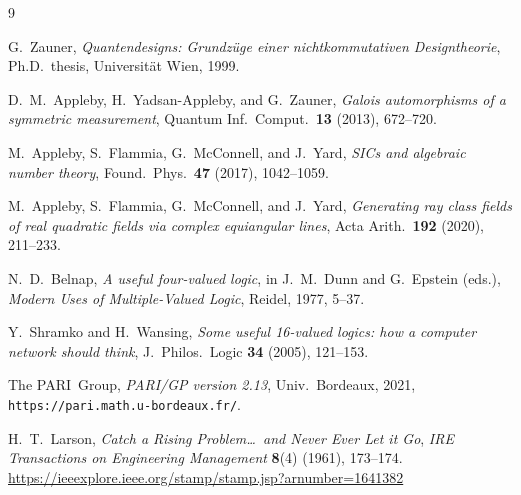 \documentclass[12pt,a4paper]{article}
\begin{document}
\begin{thebibliography}{9}

G.\ Zauner, \emph{Quantendesigns: Grundz\"uge einer nichtkommutativen Designtheorie}, Ph.D.\ thesis, Universit\"at Wien, 1999.

D.\ M.\ Appleby, H.\ Yadsan-Appleby, and G.\ Zauner,
\emph{Galois automorphisms of a symmetric measurement},
Quantum Inf.\ Comput.\ \textbf{13} (2013), 672--720.

M.\ Appleby, S.\ Flammia, G.\ McConnell, and J.\ Yard,
\emph{SICs and algebraic number theory},
Found.\ Phys.\ \textbf{47} (2017), 1042--1059.

M.\ Appleby, S.\ Flammia, G.\ McConnell, and J.\ Yard,
\emph{Generating ray class fields of real quadratic fields via complex equiangular lines}, Acta Arith.\ \textbf{192} (2020), 211--233.

N.\ D.\ Belnap, \emph{A useful four-valued logic}, in J.\ M.\ Dunn and
G.\ Epstein (eds.), \emph{Modern Uses of Multiple-Valued Logic},
Reidel, 1977, 5--37.

Y.\ Shramko and H.\ Wansing, \emph{Some useful 16-valued logics: how a
computer network should think}, J.\ Philos.\ Logic \textbf{34} (2005), 121--153.

The PARI~Group, \emph{PARI/GP version 2.13}, Univ.\ Bordeaux, 2021,
\texttt{https://pari.math.u-bordeaux.fr/}.

H.\ T.\ Larson,
\textit{Catch a Rising Problem\ldots\ and Never Ever Let it Go},
\emph{IRE Transactions on Engineering Management} \textbf{8}(4) (1961), 173--174.
\url{https://ieeexplore.ieee.org/stamp/stamp.jsp?arnumber=1641382}

\end{thebibliography}
\end{document}
